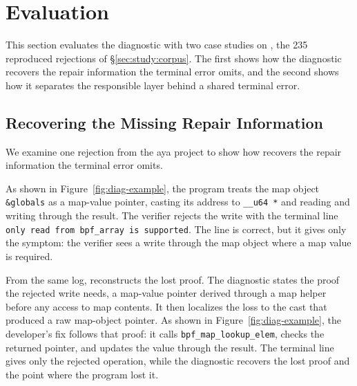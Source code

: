 \section{Evaluation}
\label{sec:evaluation}

This section evaluates the \sys diagnostic with two case studies on \empiricalset, the 235 reproduced rejections of \S\ref{sec:study:corpus}.
The first shows how the diagnostic recovers the repair information the terminal error omits, and the second shows how it separates the responsible layer behind a shared terminal error.

\subsection{Recovering the Missing Repair Information}
\label{sec:eval-diagnostic-completeness}

We examine one rejection from the aya project to show how \sys recovers the repair information the terminal error omits.

As shown in Figure~\ref{fig:diag-example}, the program treats the map object \texttt{\&globals} as a map-value pointer, casting its address to \texttt{\_\_u64 *} and reading and writing through the result.
The verifier rejects the write with the terminal line \texttt{only read from bpf\_array is supported}.
The line is correct, but it gives only the symptom: the verifier sees a write through the map object where a map value is required.

From the same log, \sys reconstructs the lost proof.
The diagnostic states the proof the rejected write needs, a map-value pointer derived through a map helper before any access to map contents.
It then localizes the loss to the cast that produced a raw map-object pointer.
As shown in Figure~\ref{fig:diag-example}, the developer's fix follows that proof: it calls \texttt{bpf\_map\_lookup\_elem}, checks the returned pointer, and updates the value through the result.
The terminal line gives only the rejected operation, while the diagnostic recovers the lost proof and the point where the program lost it.

